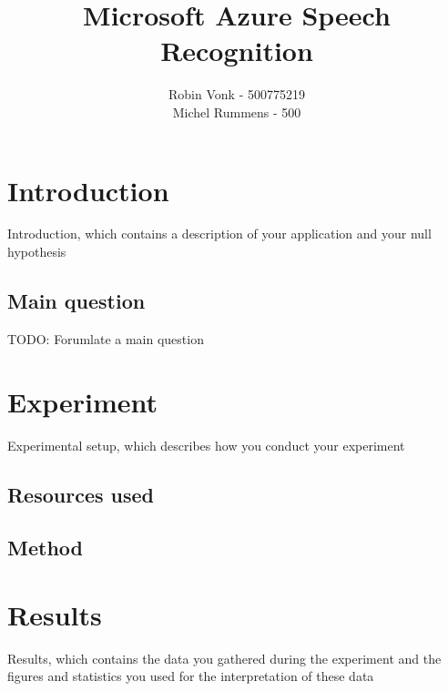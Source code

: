 \documentclass[12pt]{article}
\begin{document}
\title{Microsoft Azure Speech Recognition}
\author{Robin Vonk - 500775219 \\
		Michel Rummens - 500 \\}
\date{}


\tableofcontents
\section{Introduction}
Introduction, which contains a description of your application and your null
hypothesis
\subsection{Main question}
TODO: Forumlate a main question

\section{Experiment}
Experimental setup, which describes how you conduct your experiment
\subsection{Resources used}
\subsection{Method}

\section{Results}
Results, which contains the data you gathered during the experiment and the
figures and statistics you used for the interpretation of these data
\end{document}
